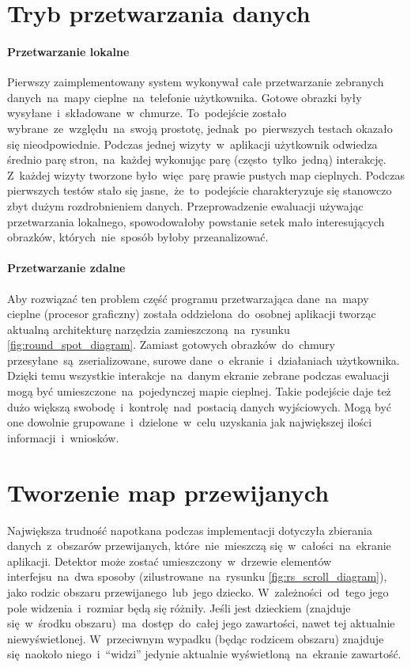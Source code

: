\section{Tryb przetwarzania danych}

\paragraph{Przetwarzanie lokalne}
Pierwszy zaimplementowany system wykonywał całe przetwarzanie zebranych danych~na~mapy cieplne~na~telefonie użytkownika. Gotowe obrazki były wysyłane~i~składowane~w~chmurze. To~podejście zostało wybrane~ze~względu~na~swoją prostotę, jednak~po~pierwszych testach okazało się nieodpowiednie. Podczas jednej wizyty~w~aplikacji  użytkownik odwiedza średnio parę stron,~na~każdej wykonując parę (często~tylko~jedną) interakcję. Z~każdej wizyty tworzone było~więc~parę prawie pustych map cieplnych. Podczas pierwszych testów stało się jasne,~że~to~podejście charakteryzuje się stanowczo zbyt dużym rozdrobnieniem danych. Przeprowadzenie ewaluacji używając przetwarzania lokalnego, spowodowałoby powstanie setek mało interesujących obrazków, których~nie~sposób byłoby przeanalizować.

\paragraph{Przetwarzanie zdalne}
Aby rozwiązać ten problem część programu przetwarzająca dane~na~mapy cieplne (procesor graficzny) została oddzielona~do~osobnej aplikacji tworząc aktualną architekturę narzędzia zamieszczoną~na~rysunku \ref{fig:round_spot_diagram}. Zamiast gotowych obrazków~do~chmury przesyłane~są~zserializowane, surowe dane~o~ekranie~i~działaniach użytkownika. Dzięki temu wszystkie interakcje~na~danym ekranie zebrane podczas ewaluacji mogą być umieszczone~na~pojedynczej mapie cieplnej. Takie podejście daje też dużo większą swobodę~i~kontrolę~nad~postacią danych wyjściowych. Mogą być one dowolnie grupowane~i~dzielone~w~celu uzyskania jak największej ilości informacji~i~wniosków.

\section{Tworzenie map przewijanych}
Największa trudność napotkana podczas implementacji dotyczyła zbierania danych~z~obszarów przewijanych, które~nie~mieszczą się~w~całości~na~ekranie aplikacji. Detektor może zostać umieszczony~w~drzewie elementów interfejsu~na~dwa sposoby (zilustrowane~na~rysunku \ref{fig:rs_scroll_diagram}), jako rodzic obszaru przewijanego~lub~jego dziecko. W~zależności~od~tego jego pole widzenia~i~rozmiar będą się różniły. Jeśli jest dzieckiem (znajduje się~w~środku obszaru)~ma~dostęp~do~całej jego zawartości, nawet tej aktualnie niewyświetlonej. W~przeciwnym wypadku (będąc rodzicem obszaru) znajduje się~naokoło niego~i~``widzi'' jedynie aktualnie wyświetloną~na~ekranie zawartość.

